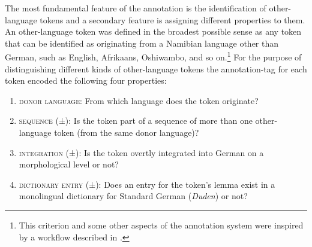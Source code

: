 \documentclass[output=paper]{langsci/langscibook}
\begin{document}
The most fundamental feature of the annotation is the identification of other-language tokens and a secondary feature is assigning different properties to them. An other-language token was defined in the broadest possible sense as any token that can be identified as originating from a Namibian language other than German, such as English, Afrikaans, Oshiwambo, and so on.\footnote{This criterion and some other aspects of the annotation system were inspired by a workflow described in \citet[42]{poplack_borrowing_2018}.} For the purpose of distinguishing different kinds of other-language tokens the annotation-tag for each token encoded the following four properties:

\begin{enumerate}
	\item \textsc{donor} \textsc{language:} From which language does the token originate?
	\item \textsc{sequence} \textsc{(±):} Is the token part of a sequence of more than one other-language token (from the same donor language)?
	\item \textsc{integration} \textsc{(±):} Is the token overtly integrated into German on a morphological level or not?
	\item \textsc{dictionary} \textsc{entry} \textsc{(±):} Does an entry for the token’s lemma exist in a monolingual dictionary for Standard German (\textit{Duden}) or not?
\end{enumerate}
    
\end{document}
